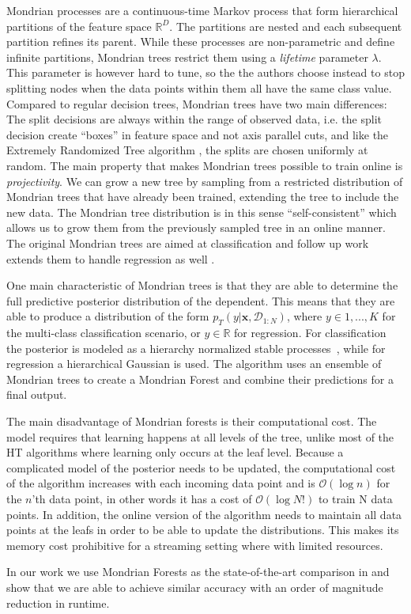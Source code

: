 Mondrian processes are a continuous-time
Markov process that form hierarchical partitions of the feature space $\mathbb{R}^D$.
The partitions are nested and each subsequent partition refines its parent. While
these processes are non-parametric and define infinite partitions, Mondrian trees
restrict them using a \emph{lifetime} parameter $\lambda$.
This parameter is however hard to tune,
so the the authors choose instead to stop splitting nodes when the data points
within them all have the same class value. Compared to regular decision trees,
Mondrian trees have two main differences: The split decisions are always within
the range of observed data, i.e. the split decision create ``boxes'' in feature
space and not axis parallel cuts, and like the Extremely Randomized Tree algorithm
\cite{ert}, the splits are chosen uniformly at random. The main property that makes Mondrian trees possible to train
online is \emph{projectivity}. We can grow a new tree by sampling from a restricted
distribution of Mondrian trees that have already been trained, extending the tree
to include the new data. The Mondrian tree distribution is in this sense ``self-consistent''
\cite{mondrian-forests-original} which allows us to grow them from the previously
sampled tree in an online manner. The original Mondrian trees are aimed at classification
and follow up work extends them to handle regression as well \cite{mondrian-forests-regression}.

One main characteristic of Mondrian trees is that they are able to determine the full
predictive posterior distribution of the dependent. This means that they are able to
produce a distribution of the form $p_T(y |\mathbf{x}, \mathcal{D}_{1:N})$, where
$y \in {1,..., K}$ for the multi-class classification scenario, or $y \in \mathbb{R}$
for regression. For classification the posterior is modeled as a hierarchy
normalized stable processes~\cite{nsp}, while for regression a hierarchical Gaussian is used.
The algorithm uses an ensemble of Mondrian trees to create a Mondrian Forest and combine
their predictions for a final output.

The main disadvantage of Mondrian forests is their computational cost. The model
requires that learning happens at all levels of the tree, unlike most of the HT
algorithms where learning only occurs at the leaf level. Because a complicated
model of the posterior needs to be updated, the computational cost of the algorithm
increases with each incoming data point and is $\mathcal{O}(\log n)$ for the $n$'th
data point, in other words it has a cost of $\mathcal{O}(\log N!)$ to train N
data points. In addition, the online version of the algorithm needs to maintain
all data points at the leafs in order to be able to update the distributions.
This makes its memory cost prohibitive for a streaming setting where with limited resources.

In our work we use Mondrian Forests as the state-of-the-art comparison in \uncertaintrees
and show that we are able to achieve similar accuracy with an order of magnitude reduction
in runtime.
